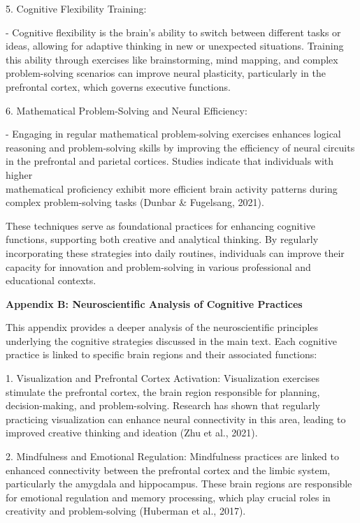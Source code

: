 \documentclass[
]{article}
\begin{document}
5. Cognitive Flexibility Training:

- Cognitive flexibility is the brain's ability to switch between
different tasks or ideas, allowing for adaptive thinking in new or
unexpected situations. Training this ability through exercises like
brainstorming, mind mapping, and complex problem-solving scenarios can
improve neural plasticity, particularly in the prefrontal cortex, which
governs executive functions.

6. Mathematical Problem-Solving and Neural Efficiency:

- Engaging in regular mathematical problem-solving exercises enhances
logical reasoning and problem-solving skills by improving the efficiency
of neural circuits in the prefrontal and parietal cortices. Studies
indicate that individuals with higher\\
mathematical proficiency exhibit more efficient brain activity patterns
during complex problem-solving tasks (Dunbar \& Fugelsang, 2021).

These techniques serve as foundational practices for enhancing cognitive
functions, supporting both creative and analytical thinking. By
regularly incorporating these strategies into daily routines,
individuals can improve their capacity for innovation and
problem-solving in various professional and educational contexts.

\textbf{Appendix B: Neuroscientific Analysis of Cognitive Practices}

This appendix provides a deeper analysis of the neuroscientific
principles underlying the cognitive strategies discussed in the main
text. Each cognitive practice is linked to specific brain regions and
their associated functions:

1. Visualization and Prefrontal Cortex Activation: Visualization
exercises stimulate the prefrontal cortex, the brain region responsible
for planning, decision-making, and problem-solving. Research has shown
that regularly practicing visualization can enhance neural connectivity
in this area, leading to improved creative thinking and ideation (Zhu et
al., 2021).

2. Mindfulness and Emotional Regulation: Mindfulness practices are
linked to enhanced connectivity between the prefrontal cortex and the
limbic system, particularly the amygdala and hippocampus. These brain
regions are responsible for emotional regulation and memory processing,
which play crucial roles in creativity and problem-solving (Huberman et
al., 2017).
\end{document}
